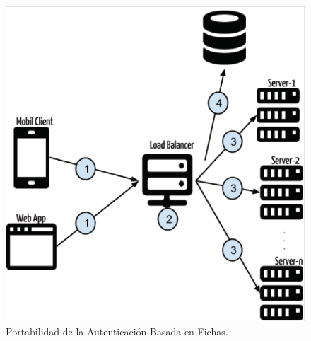     \begin{figure}
        \begin{center}
            \includegraphics{figures/tokenbaservers}
        \end{center}
        \caption{Portabilidad de la Autenticación Basada en Fichas.}
    \end{figure}
    
\pagebreak